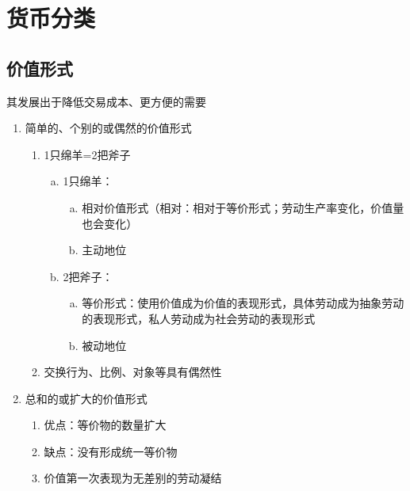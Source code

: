\documentclass[12pt]{book}
\begin{document}
\section{货币分类}







\subsection{价值形式}

其发展出于降低交易成本、更方便的需要


\begin{enumerate}[1.]
    \item 简单的、个别的或偶然的价值形式
          \begin{enumerate}[(1)]
              \item 1只绵羊=2把斧子
              \begin{enumerate}[a.]
                  \item 1只绵羊：
                        \begin{enumerate}[(a)]
                            \item 相对价值形式（相对：相对于等价形式；劳动生产率变化，价值量也会变化）
                            \item 主动地位
                        \end{enumerate}
                  \item 2把斧子：
                        \begin{enumerate}[(a)]
                            \item 等价形式：使用价值成为价值的表现形式，具体劳动成为抽象劳动的表现形式，私人劳动成为社会劳动的表现形式
                            \item 被动地位
                        \end{enumerate}
              \end{enumerate}
              \item 交换行为、比例、对象等具有偶然性
          \end{enumerate}
    \item 总和的或扩大的价值形式
          \begin{enumerate}[(1)]
              \item 优点：等价物的数量扩大
              \item 缺点：没有形成统一等价物
              \item 价值第一次表现为无差别的劳动凝结

\end{enumerate}
\end{enumerate}
\end{document}
